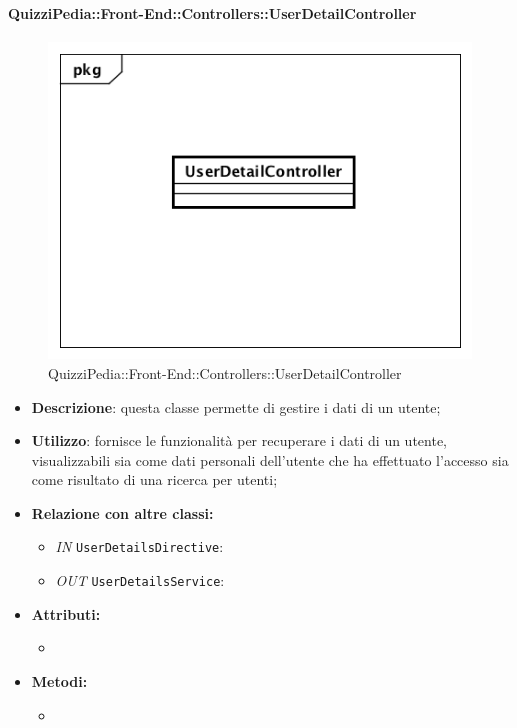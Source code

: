 \paragraph{QuizziPedia::Front-End::Controllers::UserDetailController}
\begin{figure}
	\centering
	\includegraphics[scale=0.45]{UML/Classi/Front-End/QuizziPedia_Front-end_Controller_UserDetailController.png}
	\caption{QuizziPedia::Front-End::Controllers::UserDetailController}
\end{figure}
\begin{itemize}
	\item \textbf{Descrizione}: questa classe permette di gestire i dati di un utente;
	\item \textbf{Utilizzo}: fornisce le funzionalità per recuperare i dati di un utente, visualizzabili sia come dati personali dell'utente che ha effettuato l'accesso sia come risultato di una ricerca per utenti;
	\item \textbf{Relazione con altre classi:}
	\begin{itemize}
		\item \textit{IN} \texttt{UserDetailsDirective}: 
		\item \textit{OUT} \texttt{UserDetailsService}:

	\end{itemize}
	\item \textbf{Attributi:}
	\begin{itemize}
		\item 
	\end{itemize}
	\item \textbf{Metodi:}
	\begin{itemize}
		\item 
	\end{itemize}
\end{itemize}

